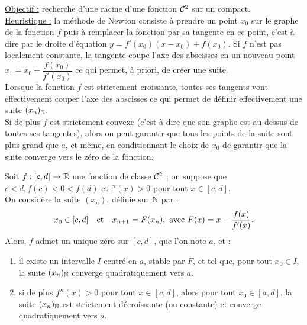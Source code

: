 



\pagestyle{fancy}

\underline{Objectif :} recherche d'une racine d'une fonction $\mathcal{C}^2$ sur un compact. \\

\underline{Heuristique :} la méthode de Newton consiste à prendre un point $x_0$ sur le graphe de la fonction $f$ 
puis à remplacer la fonction par sa tangente en ce point, c'est-à-dire par le droite d'équation $y = f'(x_0)(x-x_0) + f(x_0)$.
Si $f$ n'est pas localement constante, la tangente coupe l'axe des abscisses en un nouveau point $x_1 = x_0 + \dfrac{f(x_0)}{f'(x_0)}$ 
ce qui permet, à priori, de créer une suite. \\
Lorsque la fonction $f$ est strictement croissante, toutes ses tangents vont effectivement couper l'axe des abscisses ce qui permet de 
définir effectivement une suite $(x_n)_{\mathbb{N}}$. \\
Si de plus $f$ est strictement convexe (c'est-à-dire que son graphe est au-dessus de toutes ses tangentes), alors on peut garantir que 
tous les points de la suite sont plus grand que $a$, et même, en conditionnant le choix de $x_0$ de garantir que la suite converge vers le
zéro de la fonction. 

\begin{thm}
Soit $f:[c,d] \to \mathbb{R}$ une fonction de classe $\mathcal{C}^2$ ; on suppose que $c < d, f(c) < 0 < f(d)$ et f$'(x) >0$ pour tout $x \in [c,d]$.  \\
On considère la suite $(x_n)$, définie sur $\mathbb{N}$ par :
\[ x_0 \in [c,d] \quad \text{et} \quad x_{n+1} = F(x_n), \text{ avec } F(x) = x - \dfrac{f(x)}{f'(x)} . \]
Alors, $f$ admet un unique zéro sur $[c,d]$, que l'on note $a$, et :
\begin{enumerate}[label=(\roman*)]
\item il existe un intervalle $I$ centré en $a$, stable par $F$, et tel que, pour tout $x_0 \in I$, la suite $(x_n)_{\mathbb{N}}$ converge
quadratiquement vers $a$.
\item si de plus $f''(x)>0$ pour tout $x \in [c,d]$, alors pour tout $x_0 \in [a,d]$, la suite $(x_n)_{\mathbb{N}}$ est strictement décroissante 
(ou constante) et converge quadratiquement vers $a$.
\end{enumerate}
\end{thm}

